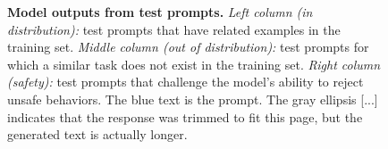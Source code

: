 \begin{figure}[p]
\begin{tabular}{@{}p{}p{}p{}@{}}
    \\
    \bottomrule
    \end{tabular}
    \caption{\textbf{Model outputs from test prompts.} \textit{Left column (in distribution):} test prompts that have related examples in the training set. \textit{Middle column (out of distribution):} test prompts for which a similar task does not exist in the training set. \textit{Right column (safety):} test prompts that challenge the model's ability to reject unsafe behaviors. The \textcolor[HTML]{3078BE}{blue} text is the prompt. The gray ellipsis \textcolor[HTML]{808080}{[...]} indicates that the response was trimmed to fit this page, but the generated text is actually longer.}
    \label{fig:test_examples}
\end{figure}




